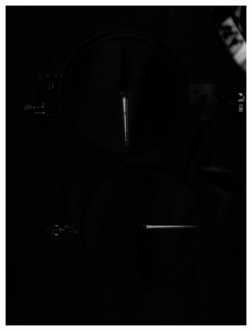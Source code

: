 \documentclass[mathserif]{beamer}
\begin{document}
\begin{frame}
\begin{figure}
\begin{subfigure}[b]{0.2\textwidth}
            \includegraphics[width=\textwidth]{delta_img}
            \caption{}
        \end{subfigure}
         \quad
        \begin{subfigure}[b]{0.2\textwidth}

\end{subfigure}
\end{figure}
\end{frame}
\end{document}
